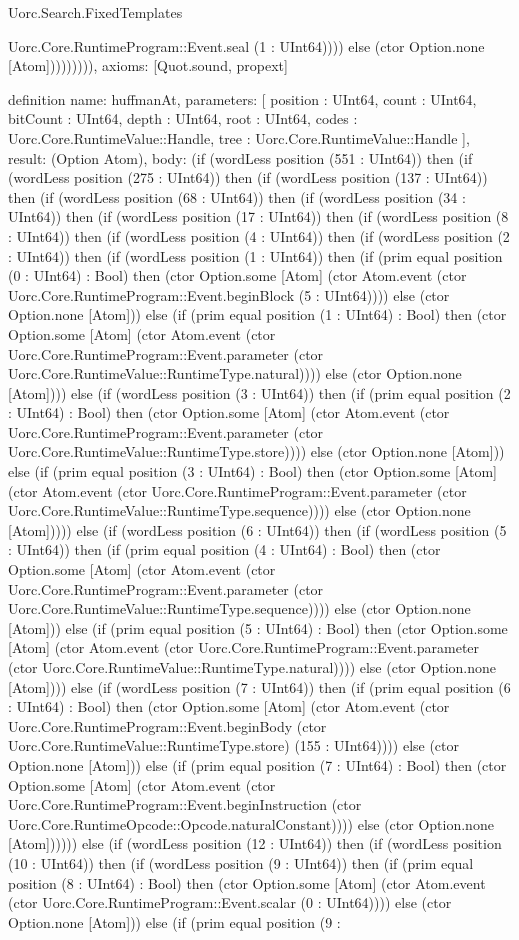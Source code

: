 \begin{lexlean}{Uorc.Search.FixedTemplates}
\begin{semanticmodule}
{Uorc.Core.RuntimeProgram::Event.seal (1 : UInt64)))) else (ctor Option.none [Atom])))))))),
  axioms: [Quot.sound, propext]
}

definition{
  name: huffmanAt,
  parameters: [
    position : UInt64,
    count : UInt64,
    bitCount : UInt64,
    depth : UInt64,
    root : UInt64,
    codes : Uorc.Core.RuntimeValue::Handle,
    tree : Uorc.Core.RuntimeValue::Handle
  ],
  result: (Option Atom),
  body: (if (wordLess position (551 : UInt64)) then (if (wordLess position (275 : UInt64)) then (if (wordLess position (137 : UInt64)) then (if (wordLess position (68 : UInt64)) then (if (wordLess position (34 : UInt64)) then (if (wordLess position (17 : UInt64)) then (if (wordLess position (8 : UInt64)) then (if (wordLess position (4 : UInt64)) then (if (wordLess position (2 : UInt64)) then (if (wordLess position (1 : UInt64)) then (if (prim equal position (0 : UInt64) : Bool) then (ctor Option.some [Atom] (ctor Atom.event (ctor Uorc.Core.RuntimeProgram::Event.beginBlock (5 : UInt64)))) else (ctor Option.none [Atom])) else (if (prim equal position (1 : UInt64) : Bool) then (ctor Option.some [Atom] (ctor Atom.event (ctor Uorc.Core.RuntimeProgram::Event.parameter (ctor Uorc.Core.RuntimeValue::RuntimeType.natural)))) else (ctor Option.none [Atom]))) else (if (wordLess position (3 : UInt64)) then (if (prim equal position (2 : UInt64) : Bool) then (ctor Option.some [Atom] (ctor Atom.event (ctor Uorc.Core.RuntimeProgram::Event.parameter (ctor Uorc.Core.RuntimeValue::RuntimeType.store)))) else (ctor Option.none [Atom])) else (if (prim equal position (3 : UInt64) : Bool) then (ctor Option.some [Atom] (ctor Atom.event (ctor Uorc.Core.RuntimeProgram::Event.parameter (ctor Uorc.Core.RuntimeValue::RuntimeType.sequence)))) else (ctor Option.none [Atom])))) else (if (wordLess position (6 : UInt64)) then (if (wordLess position (5 : UInt64)) then (if (prim equal position (4 : UInt64) : Bool) then (ctor Option.some [Atom] (ctor Atom.event (ctor Uorc.Core.RuntimeProgram::Event.parameter (ctor Uorc.Core.RuntimeValue::RuntimeType.sequence)))) else (ctor Option.none [Atom])) else (if (prim equal position (5 : UInt64) : Bool) then (ctor Option.some [Atom] (ctor Atom.event (ctor Uorc.Core.RuntimeProgram::Event.parameter (ctor Uorc.Core.RuntimeValue::RuntimeType.natural)))) else (ctor Option.none [Atom]))) else (if (wordLess position (7 : UInt64)) then (if (prim equal position (6 : UInt64) : Bool) then (ctor Option.some [Atom] (ctor Atom.event (ctor Uorc.Core.RuntimeProgram::Event.beginBody (ctor Uorc.Core.RuntimeValue::RuntimeType.store) (155 : UInt64)))) else (ctor Option.none [Atom])) else (if (prim equal position (7 : UInt64) : Bool) then (ctor Option.some [Atom] (ctor Atom.event (ctor Uorc.Core.RuntimeProgram::Event.beginInstruction (ctor Uorc.Core.RuntimeOpcode::Opcode.naturalConstant)))) else (ctor Option.none [Atom]))))) else (if (wordLess position (12 : UInt64)) then (if (wordLess position (10 : UInt64)) then (if (wordLess position (9 : UInt64)) then (if (prim equal position (8 : UInt64) : Bool) then (ctor Option.some [Atom] (ctor Atom.event (ctor Uorc.Core.RuntimeProgram::Event.scalar (0 : UInt64)))) else (ctor Option.none [Atom])) else (if (prim equal position (9 : }
\end{semanticmodule}
\end{lexlean}
